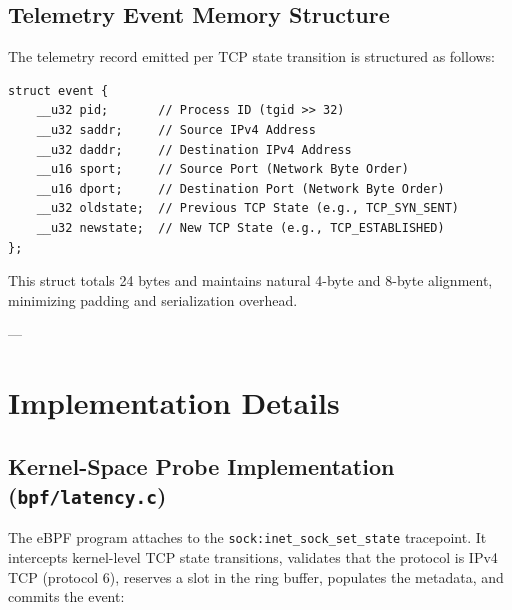 \documentclass[11pt,a4paper]{article}
\begin{document}
\subsection{Telemetry Event Memory Structure}
The telemetry record emitted per TCP state transition is structured as follows:

\begin{lstlisting}[style=cstyle, caption={Kernel-to-Userspace Event Struct}]
struct event {
    __u32 pid;       // Process ID (tgid >> 32)
    __u32 saddr;     // Source IPv4 Address
    __u32 daddr;     // Destination IPv4 Address
    __u16 sport;     // Source Port (Network Byte Order)
    __u16 dport;     // Destination Port (Network Byte Order)
    __u32 oldstate;  // Previous TCP State (e.g., TCP_SYN_SENT)
    __u32 newstate;  // New TCP State (e.g., TCP_ESTABLISHED)
};
\end{lstlisting}

This struct totals 24 bytes and maintains natural 4-byte and 8-byte alignment, minimizing padding and serialization overhead.

---

\section{Implementation Details}

\subsection{Kernel-Space Probe Implementation (\texttt{bpf/latency.c})}
The eBPF program attaches to the \texttt{sock:inet\_sock\_set\_state} tracepoint. It intercepts kernel-level TCP state transitions, validates that the protocol is IPv4 TCP (protocol 6), reserves a slot in the ring buffer, populates the metadata, and commits the event:
\end{document}
